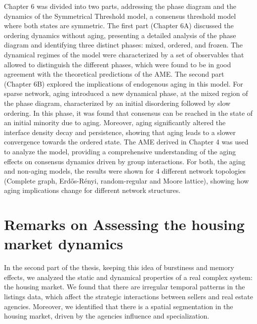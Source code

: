 Chapter 6 was divided into two parts, addressing the phase diagram and the dynamics of the Symmetrical Threshold model, a consensus threshold model where both states are symmetric. The first part (Chapter 6A) discussed the ordering dynamics without aging, presenting a detailed analysis of the phase diagram and identifying three distinct phases: mixed, ordered, and frozen. The dynamical regimes of the model were characterized by a set of observables that allowed to distinguish the different phases, which were found to be in good agreement with the theoretical predictions of the AME. The second part (Chapter 6B) explored the implications of endogenous aging in this model. For sparse network, aging introduced a new dynamical phase, at the mixed region of the phase diagram, characterized by an initial disordering followed by slow ordering. In this phase, it was found that consensus can be reached in the state of an initial minority due to aging. Moreover, aging significantly altered the interface density decay and persistence, showing that aging leads to a slower convergence towards the ordered state. The AME derived in Chapter 4 was used to analyze the model, providing a comprehensive understanding of the aging effects on consensus dynamics driven by group interactions. For both, the aging and non-aging models, the results were shown for 4 different network topologies (Complete graph, Erd\H{o}s-Rényi, random-regular and Moore lattice), showing how aging implications change for different network structures.

\section{Remarks on Assessing the housing market dynamics \label{sec:housing_market_dynamics}}

In the second part of the thesis, keeping this idea of burstiness and memory effects, we analyzed the static and dynamical properties of a real complex system: the housing market. We found that there are irregular temporal patterns in the listings data, which affect the strategic interactions between sellers and real estate agencies. Moreover, we identified that there is a spatial segmentation in the housing market, driven by the agencies influence and specialization.

